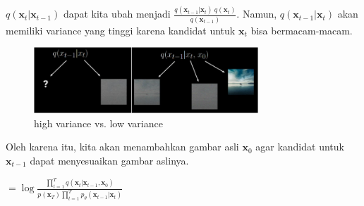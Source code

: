 \documentclass{article}
\begin{document}
$ q(\textbf{x}_{t}|\textbf{x}_{t-1}) $ dapat kita ubah menjadi $ \frac{q(\textbf{x}_{t-1}|\textbf{x}_t) \ q(\textbf{x}_t) }{ q(\textbf{x}_{t-1}) } $. Namun, $ q(\textbf{x}_{t-1}|\textbf{x}_t) $ akan memiliki variance yang tinggi karena kandidat untuk $ \textbf{x}_{t} $ bisa bermacam-macam.
\begin{figure}[h]
    \centering
    \includegraphics[width=0.75\textwidth]{fig/high-variance-vs-low-variance.png}
    \caption{high variance vs. low variance}
    \label{fig:high-variance-vs-low-variance}
\end{figure}

Oleh karena itu, kita akan menambahkan gambar asli $ \textbf{x}_0 $ agar kandidat untuk $ \textbf{x}_{t-1} $ dapat menyesuaikan gambar aslinya.
\begin{tabbing}
\hspace{6em} $ = \log \frac{\displaystyle \prod_{t=1}^{T} q(\textbf{x}_{t}|\textbf{x}_{t-1},\textbf{x}_0) } { p(\textbf{x}_T) \displaystyle \prod_{t=1}^{T} p_\theta(\textbf{x}_{t-1}|\textbf{x}_{t})} $
\end{tabbing}
\end{document}

